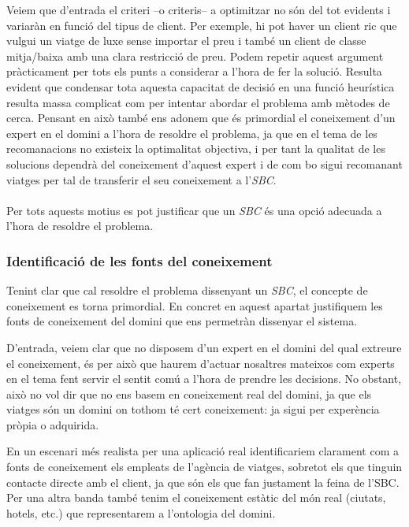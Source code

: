 \documentclass[11pt,a4paper]{article}
\begin{document}
Veiem que d'entrada el criteri --o criteris-- a optimitzar no són del tot evidents i variaràn en funció del tipus de client. Per exemple, hi pot haver un client ric que vulgui un viatge de luxe sense importar el preu i també un client de classe mitja/baixa amb una clara restricció de preu. Podem repetir aquest argument pràcticament per tots els punts a considerar a l'hora de fer la solució. Resulta evident que condensar tota aquesta capacitat de decisió en una funció heurística resulta massa complicat com per intentar abordar el problema amb mètodes de cerca. Pensant en això també ens adonem que és primordial el coneixement d'un expert en el domini a l'hora de resoldre el problema, ja que en el tema de les recomanacions no existeix la optimalitat objectiva, i per tant la qualitat de les solucions dependrà del coneixement d'aquest expert i de com bo sigui recomanant viatges per tal de transferir el seu coneixement a l'\emph{SBC}. \\\\ Per tots aquests motius es pot justificar que un \emph{SBC} és una opció adecuada a l'hora de resoldre el problema.

\subsubsection{Identificació de les fonts del coneixement}
Tenint clar que cal resoldre el problema dissenyant un \emph{SBC}, el concepte de coneixement es torna primordial. En concret en aquest apartat justifiquem les fonts de coneixement del domini que ens permetràn dissenyar el sistema.

D'entrada, veiem clar que no disposem d'un expert en el domini del qual extreure el coneixement, és per això que haurem d'actuar nosaltres mateixos com experts en el tema fent servir el sentit comú a l'hora de prendre les decisions. No obstant, això no vol dir que no ens basem en coneixement real del domini, ja que els viatges són un domini on tothom té cert coneixement: ja sigui per experència pròpia o adquirida.

En un escenari més realista per una aplicació real identificariem clarament com a fonts de coneixement els empleats de l'agència de viatges, sobretot els que tinguin contacte directe amb el client, ja que són els que fan justament la feina de l'SBC. Per una altra banda també tenim el coneixement estàtic del món real (ciutats, hotels, etc.) que representarem a l'ontologia del domini.


\end{document}
